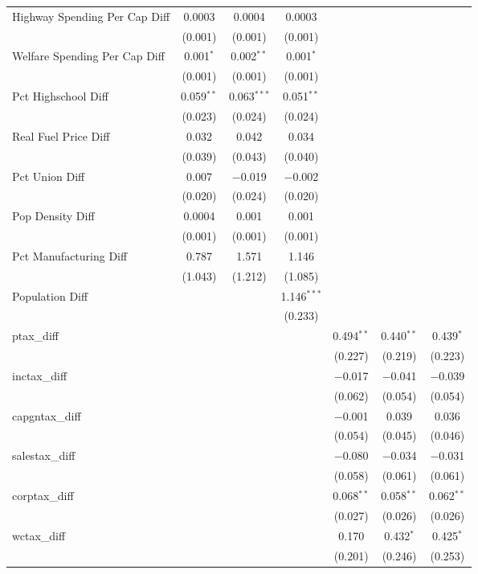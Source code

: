 \begin{table}[!htbp]
\begin{tabular}{@{\extracolsep{5pt}}lcccccc}
  Highway Spending Per Cap Diff & 0.0003 & 0.0004 & 0.0003 &  &  &  \\ 
  & (0.001) & (0.001) & (0.001) &  &  &  \\ 
  Welfare Spending Per Cap Diff & 0.001$^{*}$ & 0.002$^{**}$ & 0.001$^{*}$ &  &  &  \\ 
  & (0.001) & (0.001) & (0.001) &  &  &  \\ 
  Pct Highschool Diff & 0.059$^{**}$ & 0.063$^{***}$ & 0.051$^{**}$ &  &  &  \\ 
  & (0.023) & (0.024) & (0.024) &  &  &  \\ 
  Real Fuel Price Diff & 0.032 & 0.042 & 0.034 &  &  &  \\ 
  & (0.039) & (0.043) & (0.040) &  &  &  \\ 
  Pct Union Diff & 0.007 & $-$0.019 & $-$0.002 &  &  &  \\ 
  & (0.020) & (0.024) & (0.020) &  &  &  \\ 
  Pop Density Diff & 0.0004 & 0.001 & 0.001 &  &  &  \\ 
  & (0.001) & (0.001) & (0.001) &  &  &  \\ 
  Pct Manufacturing Diff & 0.787 & 1.571 & 1.146 &  &  &  \\ 
  & (1.043) & (1.212) & (1.085) &  &  &  \\ 
  Population Diff &  &  & 1.146$^{***}$ &  &  &  \\ 
  &  &  & (0.233) &  &  &  \\ 
  ptax\_diff &  &  &  & 0.494$^{**}$ & 0.440$^{**}$ & 0.439$^{*}$ \\ 
  &  &  &  & (0.227) & (0.219) & (0.223) \\ 
  inctax\_diff &  &  &  & $-$0.017 & $-$0.041 & $-$0.039 \\ 
  &  &  &  & (0.062) & (0.054) & (0.054) \\ 
  capgntax\_diff &  &  &  & $-$0.001 & 0.039 & 0.036 \\ 
  &  &  &  & (0.054) & (0.045) & (0.046) \\ 
  salestax\_diff &  &  &  & $-$0.080 & $-$0.034 & $-$0.031 \\ 
  &  &  &  & (0.058) & (0.061) & (0.061) \\ 
  corptax\_diff &  &  &  & 0.068$^{**}$ & 0.058$^{**}$ & 0.062$^{**}$ \\ 
  &  &  &  & (0.027) & (0.026) & (0.026) \\ 
  wctax\_diff &  &  &  & 0.170 & 0.432$^{*}$ & 0.425$^{*}$ \\ 
  &  &  &  & (0.201) & (0.246) & (0.253) \\ 

\end{tabular}
\end{table}
